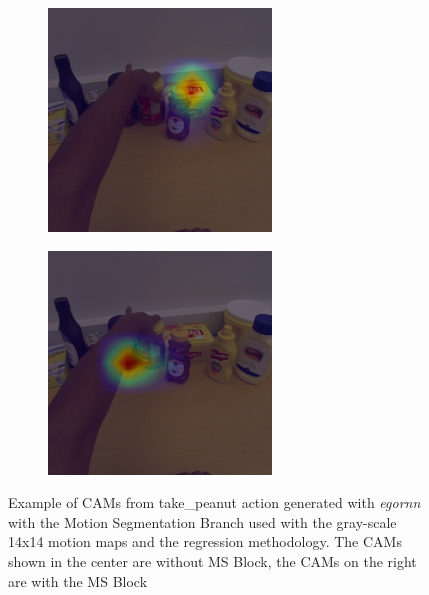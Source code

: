 \documentclass[10pt,twocolumn,hidelinks,letterpaper]{article}
\begin{document}
\begin{figure}[t]
\begin{subfigure}{.32\linewidth}
  \end{subfigure}
  \begin{subfigure}{.32\linewidth}
  	\includegraphics[width=\linewidth]{images/Cams3/S2_take_peanut/rgb0010_CAM.png}
  \end{subfigure}
  \begin{subfigure}{.32\linewidth}
  	\includegraphics[width=\linewidth]{images/Cams3/S2_take_peanut/rgb0010_CAM_MS.png}
  \end{subfigure}
  \caption{Example of CAMs from take\_peanut action generated with \textit{egornn} with the Motion Segmentation Branch used with the gray-scale 14x14 motion maps and the regression methodology. The CAMs shown in the center are without MS Block, the CAMs on the right are with the MS Block}
  \label{cam3_1}
\end{figure}
\end{document}
